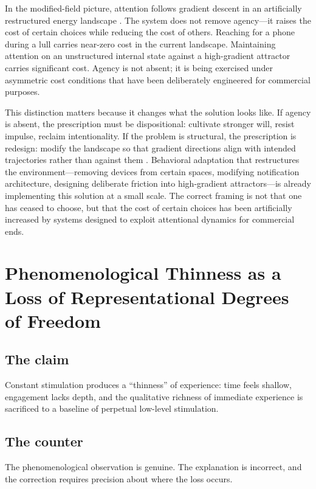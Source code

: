 \documentclass[12pt, a4paper]{article}
\begin{document}
In the modified-field picture, attention follows gradient descent in an artificially restructured energy landscape \cite{Friston2010}. The system does not remove agency---it raises the cost of certain choices while reducing the cost of others. Reaching for a phone during a lull carries near-zero cost in the current landscape. Maintaining attention on an unstructured internal state against a high-gradient attractor carries significant cost. Agency is not absent; it is being exercised under asymmetric cost conditions that have been deliberately engineered for commercial purposes.

This distinction matters because it changes what the solution looks like. If agency is absent, the prescription must be dispositional: cultivate stronger will, resist impulse, reclaim intentionality. If the problem is structural, the prescription is redesign: modify the landscape so that gradient directions align with intended trajectories rather than against them \cite{Zuboff2019}. Behavioral adaptation that restructures the environment---removing devices from certain spaces, modifying notification architecture, designing deliberate friction into high-gradient attractors---is already implementing this solution at a small scale. The correct framing is not that one has ceased to choose, but that the cost of certain choices has been artificially increased by systems designed to exploit attentional dynamics for commercial ends.

\section{Phenomenological Thinness as a Loss of Representational Degrees of Freedom}

\subsection{The claim}
Constant stimulation produces a ``thinness'' of experience: time feels shallow, engagement lacks depth, and the qualitative richness of immediate experience is sacrificed to a baseline of perpetual low-level stimulation.

\subsection{The counter}
The phenomenological observation is genuine. The explanation is incorrect, and the correction requires precision about where the loss occurs.
\end{document}
